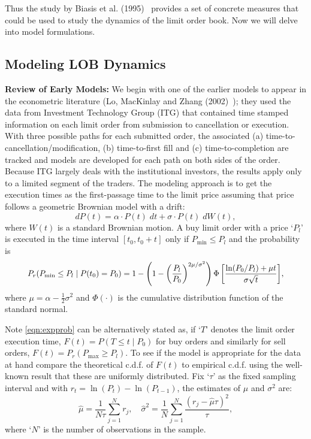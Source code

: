 Thus the study by Biasis et al. (1995)~\cite{spalt} provides a set of concrete measures that could be used to study the dynamics of the limit order book. Now we will delve into model formulations. 


\subsection{Modeling LOB Dynamics}

\noindent\textbf{Review of Early Models:} We begin with one of the earlier models to appear in the econometric literature (Lo, MacKinlay and Zhang (2002)~\cite{maczhang}); they used the data from Investment Technology Group (ITG) that contained time stamped information on each limit order from submission to cancellation or execution. With three possible paths for each submitted order, the associated (a) time-to-cancellation/modification, (b) time-to-first fill and (c) time-to-completion are tracked and models are developed for each path on both sides of the order. Because ITG largely deals with the institutional investors, the results apply only to a limited segment of the traders. The modeling approach is to get the execution times as the first-passage time to the limit price assuming that price follows a geometric Brownian model with a drift:
	\begin{equation} \label{eqn:dp(t)}
	dP(t)= \alpha \cdot P(t) \; dt + \sigma \cdot P(t) \; dW(t),
	\end{equation}
where $W(t)$ is a standard Brownian motion. A buy limit order with a price `$P_l$' is executed in the time interval $[t_0,t_0+t]$ only if $P_{\text{min}} \leq P_l$ and the probability is
	\begin{equation} \label{eqn:expprob}
	\scalebox{0.95}{$P_r(P_{\text{min}} \leq P_l \;|\; P(t_0)=P_0)= 1- \left(1 - \left(\dfrac{P_l}{P_0} \right)^{2\mu/\sigma^2} \right) \Phi\left[ \dfrac{\ln(P_0/P_l) + \mu t}{\sigma \sqrt{t}} \right]$},
	\end{equation}
where $\mu=\alpha - \frac{1}{2} \sigma^2$ and $\Phi(\cdot)$ is the cumulative distribution function of the standard normal. 


Note \eqref{eqn:expprob} can be alternatively stated as, if `$T$' denotes the limit order execution time, $F(t)=P(T \leq t \;|\; P_0)$ for buy orders and similarly for sell orders, $F(t)=P_r(P_{\text{max}} \geq P_l)$. To see if the model is appropriate for the data at hand compare the theoretical c.d.f. of $F(t)$ to empirical c.d.f. using the well-known result that these are uniformly distributed. Fix `$\tau$' as the fixed sampling interval and with $r_t=\ln(P_t)-\ln(P_{t-1})$, the estimates of $\mu$ and $\sigma^2$ are:
	\begin{equation} \label{eqn:sampleestm}
	\hat{\mu}= \dfrac{1}{N\tau} \sum_{j=1}^N r_j, \quad \hat{\sigma}^2= \dfrac{1}{N} \sum_{j=1}^N \dfrac{(r_j - \hat{\mu} \tau)^2}{\tau},
	\end{equation}
where `$N$' is the number of observations in the sample. 


